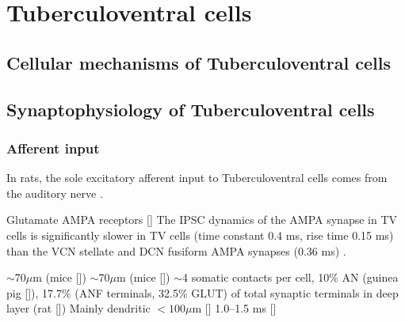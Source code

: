 \section{Tuberculoventral cells}



\subsection{Cellular mechanisms of Tuberculoventral cells}

\subsection{Synaptophysiology of Tuberculoventral cells}

\subsubsection{Afferent input}

In rats, the sole excitatory afferent input to Tuberculoventral cells comes from
the auditory nerve \citep{RubioJuiz:2004}.


Glutamate AMPA receptors []                          
The IPSC dynamics of the AMPA synapse in TV cells is significantly slower in TV cells (time constant 0.4 ms, rise time 0.15 ms) than the VCN stellate and DCN fusiform AMPA synapses (0.36 ms)  \citep{GardnerTrussellEtAl:1999}.


$\sim$70$\mu$m (mice [])
$\sim$70$\mu$m (mice [])
$\sim$4 somatic contacts per cell, 10\% AN (guinea pig []), 
17.7\% (ANF terminals, 32.5\% GLUT) of total synaptic terminals in deep layer (rat [])
Mainly dendritic {$<{}100\mu$}m []
1.0--1.5 ms []


\citep{RubioJuiz:2004}


